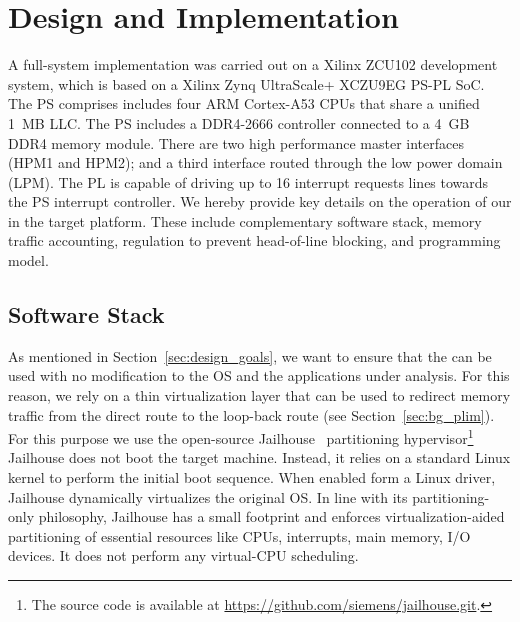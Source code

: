 \section{\schim Design and Implementation}
\label{sec:schim_implmentation}

A full-system implementation was carried out on a Xilinx ZCU102
development system, which is based on a Xilinx Zynq UltraScale+
XCZU9EG PS-PL SoC. The PS comprises includes four ARM Cortex-A53 CPUs
that share a unified 1~MB LLC. The PS includes a DDR4-2666 controller
connected to a 4~GB DDR4 memory module. There are two high performance
master interfaces (HPM1 and HPM2); and a third interface routed
through the low power domain (LPM). The PL is capable of driving up to
16 interrupt requests lines towards the PS interrupt controller. We
hereby provide key details on the operation of our \schim in the
target platform. These include complementary software stack, memory
traffic accounting, regulation to prevent head-of-line blocking, and
programming model.


\subsection{Software Stack}
As mentioned in Section~\ref{sec:design_goals}, we want to ensure that
the \schim can be used with no modification to the OS and the
applications under analysis. For this reason, we rely on a thin
virtualization layer that can be used to redirect memory traffic from
the direct route to the loop-back route (see
Section~\ref{sec:bg_plim}). For this purpose we use the open-source
Jailhouse~\cite{jailhouse} partitioning hypervisor\footnote{The source
  code is available at
  \url{https://github.com/siemens/jailhouse.git}.}  Jailhouse does not
boot the target machine. Instead, it relies on a standard Linux kernel
to perform the initial boot sequence. When enabled form a Linux
driver, Jailhouse dynamically virtualizes the original OS. In line
with its partitioning-only philosophy, Jailhouse has a small footprint
and enforces virtualization-aided partitioning of essential resources
like CPUs, interrupts, main memory, I/O devices. It does not perform
any virtual-CPU scheduling.

